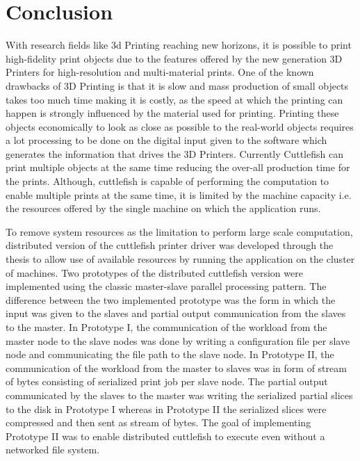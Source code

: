 \newpage   
\chapter{Conclusion}

With research fields like 3d Printing reaching new horizons, it is possible to print high-fidelity print objects due to the features offered by the new generation 3D Printers for high-resolution and multi-material prints. One of the known drawbacks of 3D Printing is that it is slow and mass production of small objects takes too much time making it is costly, as the speed at which the printing can happen is strongly influenced by the material used for printing. Printing these objects economically to look as close as possible to the real-world objects requires a lot processing to be done on the digital input given to the software which generates the information that drives the 3D Printers. Currently Cuttlefish can print multiple objects at the same time reducing the over-all production time for the prints. Although, cuttlefish is capable of performing the computation to enable multiple prints at the same time, it is limited by the machine capacity i.e. the resources offered by the single machine on which the application runs. \newline

To remove system resources as the limitation to perform large scale computation, distributed version of the cuttlefish printer driver was developed through the thesis to allow use of available resources by running the application on the cluster of machines. Two prototypes of the distributed cuttlefish version were implemented using the classic master-slave parallel processing pattern. The difference between the two implemented prototype was the form in which the input was given to the slaves and partial output communication from the slaves to the master. In Prototype I, the communication of the workload from the master node to the slave nodes was done by writing a configuration file per slave node and communicating the file path to the slave node. In Prototype II, the communication of the workload from the master to slaves was in form of stream of bytes consisting of serialized print job per slave node. The partial output communicated by the slaves to the master was writing the serialized partial slices to the disk in Prototype I whereas in Prototype II the serialized slices were compressed and then sent as stream of bytes. The goal of implementing Prototype II was to enable distributed cuttlefish to execute even without a networked file system.\newline 

